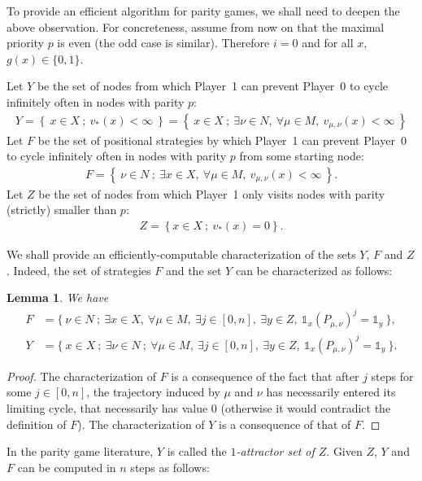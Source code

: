 \documentclass{article}
\newtheorem{lemma}{Lemma}
\def\1{{\mathds 1}}
\def\pa{Player~0}
\def\pb{Player~1}
\begin{document}
To provide an efficient algorithm for parity games, we shall need to deepen the above observation.
For concreteness, assume from now on that the maximal priority $p$ is even (the odd case is similar). Therefore $i=0$ and for all $x$, $g(x) \in \{0,1\}$.

Let $Y$ be the set of nodes from which \pb{ }can prevent \pa{ }to cycle infinitely often in nodes with parity $p$:
\begin{align}
Y = \left\{~ x \in X~;~  v_*(x)<\infty  ~\right\} = \left\{~ x \in X~;~  \exists \nu \in N,~ \forall \mu \in M,~ v_{\mu,\nu}(x)<\infty  ~\right\}
\end{align}
Let $F$ be the set of positional strategies by which \pb{ }can prevent \pa{ }to cycle infinitely often in nodes with parity $p$ from some starting node:
\begin{align}
F = \left\{~ \nu \in N ~;~ \exists x \in X,~ \forall \mu \in M,~ v_{\mu,\nu}(x)<\infty ~\right\}.
\end{align}
Let $Z$ be the set of nodes from which \pb{ }only visits nodes with parity (strictly) smaller than $p$:
\begin{align}
Z = \left\{ x \in X~;~ v_*(x)=0  \right\}. \label{Z}
\end{align}

We shall provide an efficiently-computable characterization of the sets $Y$, $F$ and $Z$.
Indeed, the set of strategies $F$ and the set $Y$ can be characterized as follows:
\begin{lemma}
  We have
  \begin{align}
    F &= \{~ \nu \in N ~;~ \exists x \in X,~ \forall \mu \in M,~ \exists j \in [0,n],~ \exists y \in Z,~ \1_x (P_{\mu,\nu})^j = \1_y ~\},\\
    Y & = \{~ x \in X~;~ \exists \nu \in N ~;~ \forall \mu \in M,~ \exists j \in [0,n],~ \exists y \in Z,~ \1_x(P_{\mu,\nu})^j = \1_y ~\}.
  \end{align}
\end{lemma}
\begin{proof}
  The characterization of $F$ is a consequence of the fact that after $j$ steps for some $j \in [0,n]$, the trajectory induced by $\mu$ and $\nu$ has necessarily entered its limiting cycle, that necessarily has value 0 (otherwise it would contradict the definition of $F$). The characterization of $Y$ is a consequence of that of $F$.
\end{proof}
In the parity game literature, $Y$ is called the \emph{$1$-attractor set of $Z$}. Given $Z$, $Y$ and $F$ can be computed in $n$ steps as follows:
\end{document}
